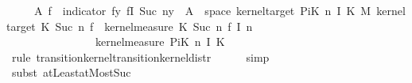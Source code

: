 \begin{isabellebody}
\ \ \ \ {\isacharparenleft}{\kern0pt}{\isasymlambda}{\isasymomega}\ A{\isacharprime}{\kern0pt}{\isachardot}{\kern0pt}\ {\isasymintegral}\isactrlsup {\isacharplus}{\kern0pt}{\isasymomega}\isactrlsub f{\isachardot}{\kern0pt}\ {\isacharparenleft}{\kern0pt}{\isasymintegral}\isactrlsup {\isacharplus}{\kern0pt}{\isasymomega}{\isachardot}{\kern0pt}\ indicator\ {\isacharparenleft}{\kern0pt}{\isacharparenleft}{\kern0pt}{\isasymlambda}{\isacharparenleft}{\kern0pt}f{\isacharcomma}{\kern0pt}y{\isacharparenright}{\kern0pt}{\isachardot}{\kern0pt}\ f{\isacharparenleft}{\kern0pt}I\ {\isacharparenleft}{\kern0pt}Suc\ n{\isacharparenright}{\kern0pt}{\isacharcolon}{\kern0pt}{\isacharequal}{\kern0pt}y{\isacharparenright}{\kern0pt}{\isacharparenright}{\kern0pt}\ {\isacharminus}{\kern0pt}{\isacharbackquote}{\kern0pt}\ A{\isacharprime}{\kern0pt}\ {\isasyminter}\ space\ {\isacharparenleft}{\kern0pt}kernel{\isacharunderscore}{\kern0pt}target\ {\isacharparenleft}{\kern0pt}PiK\ n\ I\ K{\isacharparenright}{\kern0pt}\ {\isasymOtimes}\isactrlsub M\ {\isacharparenleft}{\kern0pt}kernel{\isacharunderscore}{\kern0pt}target\ {\isacharparenleft}{\kern0pt}{\isacharquery}{\kern0pt}K\ {\isacharparenleft}{\kern0pt}Suc\ n{\isacharparenright}{\kern0pt}{\isacharparenright}{\kern0pt}{\isacharparenright}{\kern0pt}{\isacharparenright}{\kern0pt}{\isacharparenright}{\kern0pt}\ {\isacharparenleft}{\kern0pt}{\isasymomega}\isactrlsub f{\isacharcomma}{\kern0pt}\ {\isasymomega}{\isacharparenright}{\kern0pt}\ {\isasympartial}kernel{\isacharunderscore}{\kern0pt}measure\ {\isacharparenleft}{\kern0pt}{\isacharquery}{\kern0pt}K\ {\isacharparenleft}{\kern0pt}Suc\ n{\isacharparenright}{\kern0pt}{\isacharparenright}{\kern0pt}\ {\isacharparenleft}{\kern0pt}{\isasymomega}\isactrlsub f\ {\isacharparenleft}{\kern0pt}I\ n{\isacharparenright}{\kern0pt}{\isacharparenright}{\kern0pt}{\isacharparenright}{\kern0pt}\isanewline
\ \ \ \ \ \ \ \ \ \ \ \ \ \ \ \ {\isasympartial}kernel{\isacharunderscore}{\kern0pt}measure\ {\isacharparenleft}{\kern0pt}PiK\ n\ I\ K{\isacharparenright}{\kern0pt}\ {\isasymomega}{\isacharparenright}{\kern0pt}{\isachardoublequoteclose}\isanewline
\ \ \ \ \isamarkupfalse%
\ {\isacharparenleft}{\kern0pt}rule\ transition{\isacharunderscore}{\kern0pt}kernel{\isachardot}{\kern0pt}transition{\isacharunderscore}{\kern0pt}kernel{\isacharunderscore}{\kern0pt}distr{\isacharparenright}{\kern0pt}\isanewline
\ \ \ \ \isamarkupfalse%
\ simp\isanewline
\ \ \ \ \isamarkupfalse%
\ {\isacharparenleft}{\kern0pt}subst\ atLeast{}{\isacharunderscore}{\kern0pt}atMost{\isacharunderscore}{\kern0pt}Suc{\isacharparenright}{\kern0pt}\isanewline

\end{isabellebody}
